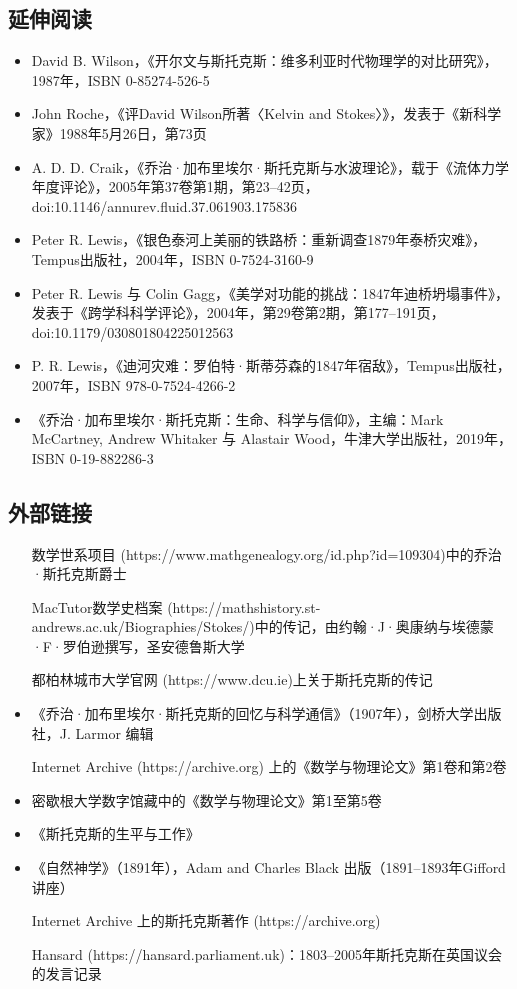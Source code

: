 \subsection{延伸阅读}
\begin{itemize}
\item David B. Wilson，《开尔文与斯托克斯：维多利亚时代物理学的对比研究》，1987年，ISBN 0-85274-526-5
\item John Roche，《评David Wilson所著〈Kelvin and Stokes〉》，发表于《新科学家》1988年5月26日，第73页
\item A. D. D. Craik，《乔治·加布里埃尔·斯托克斯与水波理论》，载于《流体力学年度评论》，2005年第37卷第1期，第23–42页，doi:10.1146/annurev.fluid.37.061903.175836
\item Peter R. Lewis，《银色泰河上美丽的铁路桥：重新调查1879年泰桥灾难》，Tempus出版社，2004年，ISBN 0-7524-3160-9
\item Peter R. Lewis 与 Colin Gagg，《美学对功能的挑战：1847年迪桥坍塌事件》，发表于《跨学科科学评论》，2004年，第29卷第2期，第177–191页，doi:10.1179/030801804225012563
\item P. R. Lewis，《迪河灾难：罗伯特·斯蒂芬森的1847年宿敌》，Tempus出版社，2007年，ISBN 978-0-7524-4266-2
\item 《乔治·加布里埃尔·斯托克斯：生命、科学与信仰》，主编：Mark McCartney, Andrew Whitaker 与 Alastair Wood，牛津大学出版社，2019年，ISBN 0-19-882286-3
\end{itemize}
\subsection{外部链接}
\begin{itemize}
\item [数学世系项目](https://www.mathgenealogy.org/id.php?id=109304)中的乔治·斯托克斯爵士
\item [MacTutor数学史档案](https://mathshistory.st-andrews.ac.uk/Biographies/Stokes/)中的传记，由约翰·J·奥康纳与埃德蒙·F·罗伯逊撰写，圣安德鲁斯大学
\item [都柏林城市大学官网](https://www.dcu.ie)上关于斯托克斯的传记
\item 《乔治·加布里埃尔·斯托克斯的回忆与科学通信》（1907年），剑桥大学出版社，J. Larmor 编辑
\item [Internet Archive](https://archive.org) 上的《数学与物理论文》第1卷和第2卷
\item 密歇根大学数字馆藏中的《数学与物理论文》第1至第5卷
\item 《斯托克斯的生平与工作》
\item 《自然神学》（1891年），Adam and Charles Black 出版（1891–1893年Gifford讲座）
\item [Internet Archive 上的斯托克斯著作](https://archive.org)
\item [Hansard](https://hansard.parliament.uk)：1803–2005年斯托克斯在英国议会的发言记录
\end{itemize}
